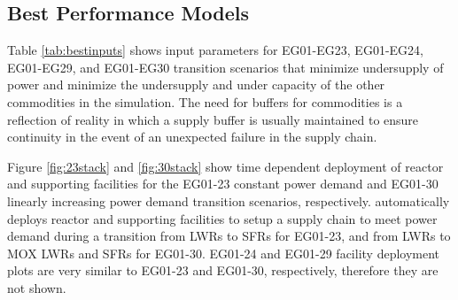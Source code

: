 \subsection{Best Performance Models}
Table \ref{tab:bestinputs} 
shows \deploy input parameters for
EG01-EG23, EG01-EG24, EG01-EG29, and EG01-EG30 transition scenarios
that minimize undersupply of power and minimize 
the undersupply and under capacity of the other commodities
in the simulation. 
The need for buffers for commodities is a reflection of reality
in which a supply buffer is usually maintained to ensure 
continuity in the event of an unexpected failure in the supply chain.

Figure \ref{fig:23stack} and \ref{fig:30stack} show
time dependent deployment of reactor and supporting facilities for 
the EG01-23 constant power demand and EG01-30 linearly increasing power demand 
transition scenarios, respectively. 
\deploy automatically deploys reactor and supporting facilities 
to setup a supply chain to meet power demand
during a transition from \glspl{LWR} to \glspl{SFR} for EG01-23, 
and from \glspl{LWR} to \gls{MOX} \glspl{LWR} and \glspl{SFR} for 
EG01-30. 
EG01-24 and EG01-29 facility deployment plots are very similar to 
EG01-23 and EG01-30, respectively, therefore they are not shown. 

